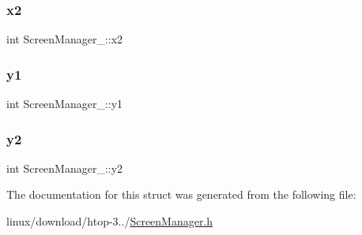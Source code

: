 \subsubsection{\texorpdfstring{x2}{x2}}
{\footnotesize\ttfamily int Screen\+Manager\+\_\+\+::x2}

\mbox{\label{structScreenManager___ab129eae7d398afea29e00a7f936018dc}} 
\subsubsection{\texorpdfstring{y1}{y1}}
{\footnotesize\ttfamily int Screen\+Manager\+\_\+\+::y1}

\mbox{\label{structScreenManager___abd39900392527e4f531060d07440a237}} 
\subsubsection{\texorpdfstring{y2}{y2}}
{\footnotesize\ttfamily int Screen\+Manager\+\_\+\+::y2}



The documentation for this struct was generated from the following file\+:\begin{DoxyCompactItemize}
\item 
linux/download/htop-\/3../\hyperlink{ScreenManager_8h}{Screen\+Manager.\+h}\end{DoxyCompactItemize}
